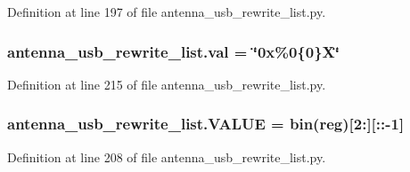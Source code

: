 Definition at line 197 of file antenna\+\_\+usb\+\_\+rewrite\+\_\+list.\+py.

\subsubsection[{\texorpdfstring{val}{val}}]{ antenna\+\_\+usb\+\_\+rewrite\+\_\+list.\+val = \char`\"{}0x\%0\{0\}\+X\char`\"{}}\hypertarget{namespaceantenna__usb__rewrite__list_ac051df5193c46e89320db8b4ac29eb97}{}\label{namespaceantenna__usb__rewrite__list_ac051df5193c46e89320db8b4ac29eb97}


Definition at line 215 of file antenna\+\_\+usb\+\_\+rewrite\+\_\+list.\+py.

\subsubsection[{\texorpdfstring{V\+A\+L\+UE}{VALUE}}]{\setlength{\rightskip}{0pt plus 5cm}antenna\+\_\+usb\+\_\+rewrite\+\_\+list.\+V\+A\+L\+UE = bin({\bf reg})\mbox{[}2\+:\mbox{]}\mbox{[}\+::-\/1\mbox{]}}\hypertarget{namespaceantenna__usb__rewrite__list_a57c3f351c2f378d8b32a5535ae505735}{}\label{namespaceantenna__usb__rewrite__list_a57c3f351c2f378d8b32a5535ae505735}


Definition at line 208 of file antenna\+\_\+usb\+\_\+rewrite\+\_\+list.\+py.

